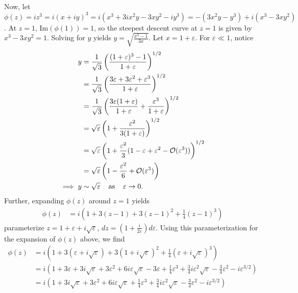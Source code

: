 \documentclass{article}
\begin{document}
\begin{itemize}
    Now, let $\phi(z) = iz^3 = i(x + iy)^3 = i(x^3 + 3ix^2y - 3xy^2 - iy^3) = -(3x^2y - y^3) + i(x^3 - 3xy^2)$. At $z = 1$, $\text{Im}(\phi(1)) = 1$, so the steepest descent curve at $z = 1$ is given by $x^3 - 3xy^2 = 1$. Solving for $y$ yields $y = \sqrt{\frac{x^3 - 1}{3x}}$. Let $x = 1 + \varepsilon$. For $\varepsilon \ll 1$, notice
    \begin{align*}
        y &= \frac{1}{\sqrt{3}}\left(\frac{(1 + \varepsilon)^3 - 1}{1 + \varepsilon}\right)^{1/2}\\
        &= \frac{1}{\sqrt{3}}\left(\frac{3\varepsilon + 3\varepsilon^2 + \varepsilon^3}{1 + \varepsilon}\right)^{1/2}\\
        &= \frac{1}{\sqrt{3}}\left(\frac{3\varepsilon(1 + \varepsilon)}{1 + \varepsilon} + \frac{\varepsilon^3}{1 + \varepsilon}\right)^{1/2}\\
        &= \sqrt{\varepsilon}\left(1 + \frac{\varepsilon^2}{3(1 + \varepsilon)}\right)^{1/2}\\
        &= \sqrt{\varepsilon}\left(1 + \frac{\varepsilon^2}{3}(1 - \varepsilon + \varepsilon^2 - \mathcal{O}(\varepsilon^3))\right)^{1/2}\\
        &= \sqrt{\varepsilon}\left(1 - \frac{\varepsilon^2}{6} + \mathcal{O}(\varepsilon^3)\right)\\
        \implies y &\sim \sqrt{\varepsilon} \hspace{0.4cm} \text{as} \hspace{0.4cm} \varepsilon \to 0.
    \end{align*}
    Further, expanding $\phi(z)$ around $z = 1$ yields
    \begin{align*}
        \phi(z) &= i\left(1 + 3(z - 1) + 3(z - 1)^2 + \frac{1}{4}(z - 1)^3\right)
    \end{align*}
    parameterize $z = 1 + \varepsilon + i\sqrt{\varepsilon}$, $dz = \left(1 + \frac{i}{2\varepsilon}\right)d\varepsilon$. Using this parameterization for the expansion of $\phi(z)$ above, we find
    \begin{align*}
        \phi(z) &= i\left(1 + 3(\varepsilon + i\sqrt{\varepsilon}) + 3(1 + i\sqrt{\varepsilon})^2 + \frac{1}{4}(\varepsilon + i\sqrt{\varepsilon})^3\right)\\
        &= i\left(1 + 3\varepsilon + 3i\sqrt{\varepsilon} + 3\varepsilon^2 + 6i\varepsilon\sqrt{\varepsilon} - 3\varepsilon + \frac{1}{4}\varepsilon^3 + \frac{3}{4}i\varepsilon^2\sqrt{\varepsilon} - \frac{3}{4}\varepsilon^2 - i\varepsilon^{3/2}\right)\\
        &= i\left(1 + 3i\sqrt{\varepsilon} + 3\varepsilon^2 + 6i\varepsilon\sqrt{\varepsilon} + \frac{1}{4}\varepsilon^3 + \frac{3}{4}i\varepsilon^2\sqrt{\varepsilon} - \frac{3}{4}\varepsilon^2 - i\varepsilon^{3/2}\right)\\

\end{align*}
\end{itemize}
\end{document}
